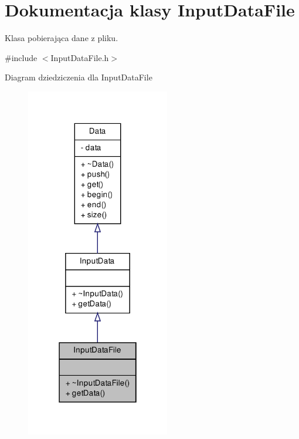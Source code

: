 \hypertarget{class_input_data_file}{\section{\-Dokumentacja klasy \-Input\-Data\-File}
\label{class_input_data_file}
}


\-Klasa pobierająca dane z pliku.  




{\ttfamily \#include $<$\-Input\-Data\-File.\-h$>$}



\-Diagram dziedziczenia dla \-Input\-Data\-File\nopagebreak
\begin{figure}[H]
\begin{center}
\leavevmode
\includegraphics[width=178pt]{class_input_data_file__inherit__graph}
\end{center}
\end{figure}


